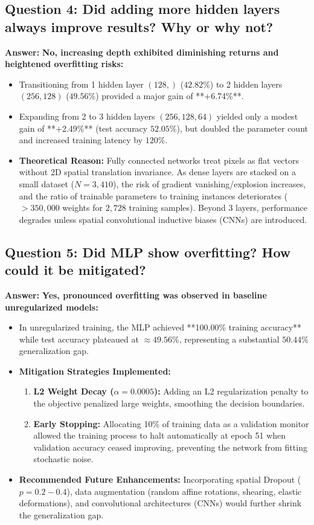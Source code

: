 \documentclass[12pt,a4paper]{article}
\begin{document}
\subsection{Question 4: Did adding more hidden layers always improve results? Why or why not?}
\textbf{Answer:}
\textbf{No, increasing depth exhibited diminishing returns and heightened overfitting risks:}
\begin{itemize}[noitemsep]
    \item Transitioning from 1 hidden layer $(128,)$ ($42.82\%$) to 2 hidden layers $(256, 128)$ ($49.56\%$) provided a major gain of **+6.74\%**.
    \item Expanding from 2 to 3 hidden layers $(256, 128, 64)$ yielded only a modest gain of **+2.49\%** (test accuracy $52.05\%$), but doubled the parameter count and increased training latency by $120\%$.
    \item \textbf{Theoretical Reason:} Fully connected networks treat pixels as flat vectors without 2D spatial translation invariance. As dense layers are stacked on a small dataset ($N=3,410$), the risk of gradient vanishing/explosion increases, and the ratio of trainable parameters to training instances deteriorates ($>350,000$ weights for $2,728$ training samples). Beyond 3 layers, performance degrades unless spatial convolutional inductive biases (CNNs) are introduced.
\end{itemize}

\subsection{Question 5: Did MLP show overfitting? How could it be mitigated?}
\textbf{Answer:}
\textbf{Yes, pronounced overfitting was observed in baseline unregularized models:}
\begin{itemize}[noitemsep]
    \item In unregularized training, the MLP achieved **100.00\% training accuracy** while test accuracy plateaued at $\approx 49.56\%$, representing a substantial $50.44\%$ generalization gap.
    \item \textbf{Mitigation Strategies Implemented:}
    \begin{enumerate}[label=(\alph*),noitemsep]
        \item \textbf{L2 Weight Decay ($\alpha = 0.0005$):} Adding an L2 regularization penalty to the objective penalized large weights, smoothing the decision boundaries.
        \item \textbf{Early Stopping:} Allocating 10\% of training data as a validation monitor allowed the training process to halt automatically at epoch 51 when validation accuracy ceased improving, preventing the network from fitting stochastic noise.
    \end{enumerate}
    \item \textbf{Recommended Future Enhancements:} Incorporating spatial Dropout ($p = 0.2 - 0.4$), data augmentation (random affine rotations, shearing, elastic deformations), and convolutional architectures (CNNs) would further shrink the generalization gap.
\end{itemize}
\end{document}
